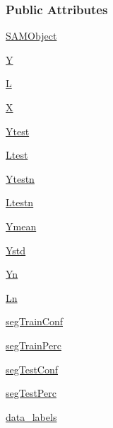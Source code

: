 \subsubsection*{Public Attributes}
\begin{DoxyCompactItemize}
\item 
\hyperlink{group__icubclient__SAM__Drivers_ga58c437c869d397cc69296ba13eecbce2}{S\+A\+M\+Object}
\item 
\hyperlink{group__icubclient__SAM__Drivers_ga462d762fee5145a93abaccf45505391d}{Y}
\item 
\hyperlink{group__icubclient__SAM__Drivers_gad584d554bc3c5c82f75c37d69c66add2}{L}
\item 
\hyperlink{group__icubclient__SAM__Drivers_gaafcaf934890fe0ea13e17f384868b07d}{X}
\item 
\hyperlink{group__icubclient__SAM__Drivers_ga47e71ceed497adbec4ba952b4385d8b1}{Ytest}
\item 
\hyperlink{group__icubclient__SAM__Drivers_ga25f88f3ef7b54ea69fba9ef30fe929bd}{Ltest}
\item 
\hyperlink{group__icubclient__SAM__Drivers_ga8ce3d609c06b6374b1c18a8236042186}{Ytestn}
\item 
\hyperlink{group__icubclient__SAM__Drivers_gad85dff96ce76cf33eb3c2806c88339ce}{Ltestn}
\item 
\hyperlink{group__icubclient__SAM__Drivers_ga8744836c0d908359d2de313417311dac}{Ymean}
\item 
\hyperlink{group__icubclient__SAM__Drivers_gab4f0e7e943deb9806f07908a5aaa36fe}{Ystd}
\item 
\hyperlink{group__icubclient__SAM__Drivers_ga2317645ba1bb66c3c7527687cfe3262e}{Yn}
\item 
\hyperlink{group__icubclient__SAM__Drivers_ga22a80ec6fb07792d354d1267e52c3b7c}{Ln}
\item 
\hyperlink{group__icubclient__SAM__Drivers_ga510653c29b923373a47faf252919d6cb}{seg\+Train\+Conf}
\item 
\hyperlink{group__icubclient__SAM__Drivers_gaf7748998c4b4347aaac0df1cc38a830c}{seg\+Train\+Perc}
\item 
\hyperlink{group__icubclient__SAM__Drivers_ga11f7d1112da1490998b9878d212d6255}{seg\+Test\+Conf}
\item 
\hyperlink{group__icubclient__SAM__Drivers_ga0cbeb9209124fba55cb56c5de40b7a63}{seg\+Test\+Perc}
\item 
\hyperlink{group__icubclient__SAM__Drivers_gac25896ed8992a4f3315b937f8a54613d}{data\+\_\+labels}
\item 

\end{DoxyCompactItemize}
